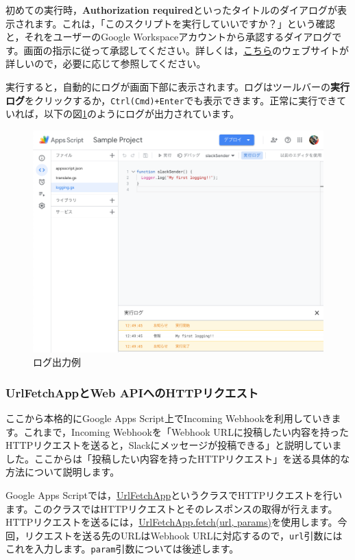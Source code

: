 \documentclass[uplatex,a4j]{jsarticle}
\begin{document}
初めての実行時，\textbf{Authorization required}といったタイトルのダイアログが表示されます。これは，「このスクリプトを実行していいですか？」という確認と，それをユーザーのGoogle Workspaceアカウントから承認するダイアログです。画面の指示に従って承認してください。詳しくは，\href{https://tonari-it.com/gas-script-approval/}{こちら}のウェブサイトが詳しいので，必要に応じて参照してください。

実行すると，自動的にログが画面下部に表示されます。ログはツールバーの\textbf{実行ログ}をクリックするか，\verb|Ctrl(Cmd)+Enter|でも表示できます。正常に実行できていれば，以下の図\ref{fig:standalone_gas2}のようにログが出力されています。

\begin{figure}[H]
 \centering
 \includegraphics[keepaspectratio, scale=0.5]{images/standalone_gas2.png}
 \caption{ログ出力例}
 \label{fig:standalone_gas2}
\end{figure}

\subsubsection{UrlFetchAppとWeb APIへのHTTPリクエスト}


ここから本格的にGoogle Apps Script上でIncoming Webhookを利用していきます。これまで，Incoming Webhookを「Webhook URLに投稿したい内容を持ったHTTPリクエストを送ると，Slackにメッセージが投稿できる」と説明していました。ここからは「投稿したい内容を持ったHTTPリクエスト」を送る具体的な方法について説明します。

Google Apps Scriptでは，\href{https://developers.google.com/apps-script/reference/url-fetch/url-fetch-app}{UrlFetchApp}というクラスでHTTPリクエストを行います。このクラスではHTTPリクエストとそのレスポンスの取得が行えます。HTTPリクエストを送るには，\href{https://developers.google.com/apps-script/reference/url-fetch/url-fetch-app#fetchurl,-params}{UrlFetchApp.fetch(url, params)}を使用します。今回，リクエストを送る先のURLはWebhook URLに対応するので，\verb|url|引数にはこれを入力します。\verb|param|引数については後述します。
\end{document}
